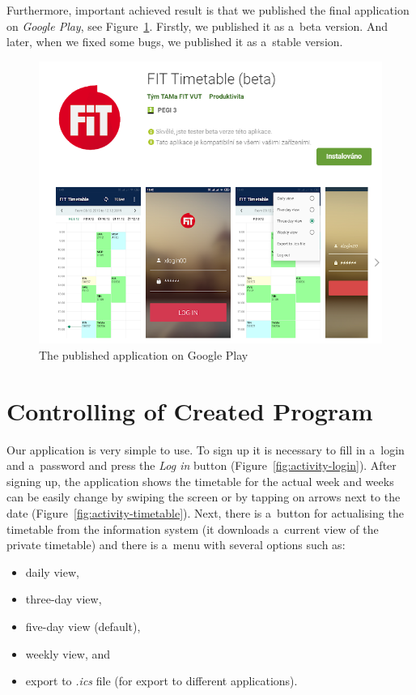 \documentclass[12pt, a4paper, titlepage, final]{article}
\begin{document}
Furthermore, important achieved result is that we published the final
application on \emph{Google Play}, see Figure~\ref{fig:google-play}. Firstly,
we published it as a~beta version. And later, when we fixed some bugs, we
published it as a~stable version.

\begin{figure}[ht]
	\centering
	\includegraphics[width=.7 \linewidth, frame]{img/googleplay.png}
	\caption{The published application on Google Play}
	\label{fig:google-play}
\end{figure}


\section*{Controlling of Created Program}

Our application is very simple to use. To sign up it is necessary to fill in
a~login and a~password and press the \emph{Log in} button
(Figure~\ref{fig:activity-login}). After signing up, the application shows the
timetable for the actual week and weeks can be easily change by swiping the
screen or by tapping on arrows next to the date
(Figure~\ref{fig:activity-timetable}). Next, there is a~button for actualising
the timetable from the information system (it downloads a~current view of the
private timetable) and there is a~menu with several options such as:
\begin{itemize}
	\item daily view,
	\item three-day view,
	\item five-day view (default),
	\item weekly view, and
	\item export to \emph{.ics} file (for export to different applications).
\end{itemize}
\end{document}
